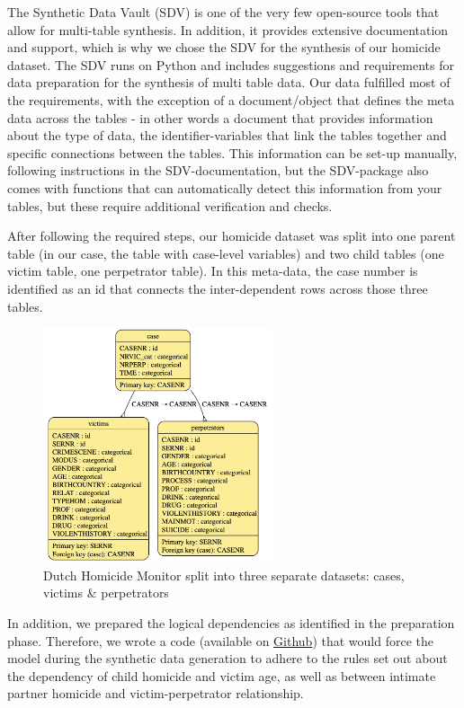 The Synthetic Data Vault (SDV) is one of the very few open-source tools that allow for multi-table synthesis. In addition, it provides extensive documentation and support, which is why we chose the SDV for the synthesis of our homicide dataset. The SDV runs on Python and includes suggestions and requirements for data preparation for the synthesis of multi table data. Our data fulfilled most of the requirements, with the exception of a document/object that defines the meta data across the tables - in other words a document that provides information about the type of data, the identifier-variables that link the tables together and specific connections between the tables. This information can be set-up manually, following instructions in the SDV-documentation, but the SDV-package also comes with functions that can automatically detect this information from your tables, but these require additional verification and checks.

After following the required steps, our homicide dataset was split into one parent table (in our case, the table with case-level variables) and two child tables (one victim table, one perpetrator table). In this meta-data, the case number is identified as an id that connects the inter-dependent rows across those three tables. 
\vspace{10pt}
\begin{figure}[H]
    \centering
    \includegraphics[width=0.6\textwidth]{Images/meta1.png}
    \caption{Dutch Homicide Monitor split into three separate datasets: cases, victims \& perpetrators}
    \label{fig:proof_1}
\end{figure}
\vspace{10pt}

In addition, we prepared the logical dependencies as identified in the preparation phase. Therefore, we wrote a code (available on \href{https://github.com/KKrusselmann/SENSYN}{Github}) that would force the model during the synthetic data generation to adhere to the rules set out about the dependency of child homicide and victim age, as well as between intimate partner homicide and victim-perpetrator relationship.


